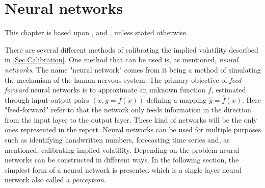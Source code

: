 \chapter{Neural networks}\label{Ch.3}
This chapter is based upon \citep[Ch. 10]{SL-ISLR}, \citep[Ch. 1]{NN} and \citep[Ch. 2]{NNDL}, unless stated otherwise.


There are several different methods of calibrating the implied volatility described in \autoref{Sec.Calibration}. One method that can be used is, as mentioned, \emph{neural networks}. The name "neural network" comes from it being a method of simulating the mechanism of the human nervous system. The primary objective of \textit{feed-forward} neural networks is to approximate an unknown function $f$, estimated through input-output pairs $(x, y = f(x))$ defining a mapping $\hat{y} = \hat{f}(x)$. Here "feed-forward" refer to that the network only feeds information in the direction from the input layer to the output layer. These kind of networks will be the only ones represented in the report. Neural networks can be used for multiple purposes such as identifying handwritten numbers, forecasting time series and, as mentioned, calibrating implied volatility. Depending on the problem neural networks can be constructed in different ways. In the following section, the simplest form of a neural network is presented which is a single layer neural network also called a \emph{perceptron}.


